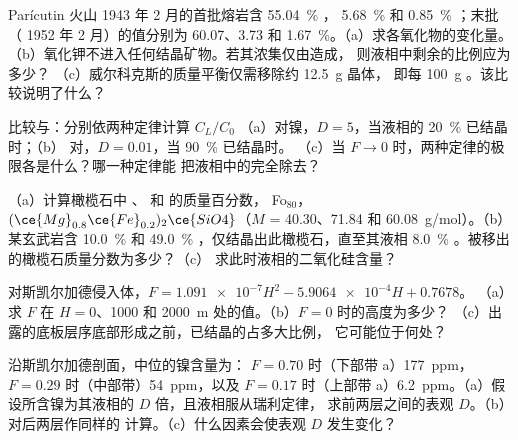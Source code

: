 \begin{exercise}[$\star$]\label{exo:b2:magmatic-differentiation:4}
Parícutin 火山 1943 年 2 月的首批熔岩含 \qty{55.04}{\percent} ，
\qty{5.68}{\percent}  和 \qty{0.85}{\percent} ；末批（
1952 年 2 月）的值分别为 60.07、3.73 和 \qty{1.67}{\percent}。（a）求各氧化物的变化量。
（b）氧化钾不进入任何结晶矿物。若其浓集仅由造成，
则液相中剩余的比例应为多少？
（c）威尔科克斯的质量平衡仅需移除约 \qty{12.5}{g} 晶体，
即每 \qty{100}{g} 。该比较说明了什么？
\end{exercise}

\begin{exercise}[$\star\star$]\label{exo:b2:magmatic-differentiation:5}
比较与：分别依两种定律计算 $C_L/C_0$
（a）对镍，$D = 5$，当液相的 \qty{20}{\percent} 已结晶时；（b）
对，$D = 0.01$，当 \qty{90}{\percent} 已结晶时。
（c）当 $F \to 0$ 时，两种定律的极限各是什么？哪一种定律能
把液相中的完全除去？
\end{exercise}

\begin{exercise}[$\star\star$]\label{exo:b2:magmatic-differentiation:6}
（a）计算橄榄石中 、 和  的质量百分数，
Fo$_{80}$，$(\ce{Mg}_{0.8}\ce{Fe}_{0.2})_2\ce{SiO4}$（$M$ = 40.30、71.84 和
\qty{60.08}{g/mol}）。（b）某玄武岩含 \qty{10.0}{\percent}  和
\qty{49.0}{\percent} ，仅结晶出此橄榄石，直至其液相
\qty{8.0}{\percent} 。被移出的橄榄石质量分数为多少？（c）
求此时液相的二氧化硅含量？
\end{exercise}

\begin{exercise}[$\star\star$]\label{exo:b2:magmatic-differentiation:7}
对斯凯尔加德侵入体，$F = \num{1.091e-7}H^2 - \num{5.9064e-4}H + 0.7678$。
（a）求 $F$ 在 $H = 0$、1000 和 \qty{2000}{m} 处的值。（b）$F = 0$ 时的高度为多少？
（c）出露的底板层序底部形成之前，已结晶的占多大比例，
它可能位于何处？
\end{exercise}

\begin{exercise}[$\star\star$]\label{exo:b2:magmatic-differentiation:8}
沿斯凯尔加德剖面，中位的镍含量为：
$F = 0.70$ 时（下部带 a）\qty{177}{ppm}，$F = 0.29$ 时（中部带）\qty{54}{ppm}，以及
$F = 0.17$ 时（上部带 a）\qty{6.2}{ppm}。（a）假设所含镍为其液相的
$D$ 倍，且液相服从瑞利定律，
求前两层之间的表观 $D$。（b）对后两层作同样的
计算。（c）什么因素会使表观 $D$ 发生变化？
\end{exercise}

